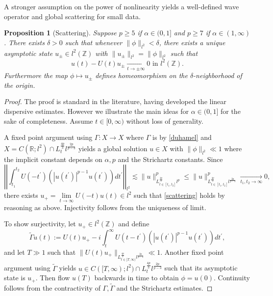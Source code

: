 \documentclass{article}
\numberwithin{equation}{section}
\newtheorem{proposition}{Proposition}[section]
\begin{document}
A stronger assumption on the power of nonlinearity yields a well-defined wave operator and global scattering for small data.
\begin{proposition}[Scattering]\label{scattering2}
Suppose $p \geq 5$ if $\alpha \in (0,1]$ and $p \geq 7$ if $\alpha \in (1,\infty)$. There exists $\delta > 0$ such that whenever $\| \phi \|_{l^2} < \delta$, there exists a unique asymptotic state $u_{\pm} \in l^2(\mathbb{Z})$ with 
$\| u_{\pm} \|_{l^2} = \| \phi \|_{l^2}$ such that
\begin{equation}\label{scattering}
 u(t) - U(t)u_{\pm} \xrightarrow[t\rightarrow \pm\infty]{} 0 \text{ in } l^2(\mathbb{Z}). 
\end{equation}
Furthermore the map $\phi \mapsto u_{\pm}$ defines homeomorphism on the $\delta$-neighborhood of the origin. 
\end{proposition}
\begin{proof}
The proof is standard in the literature, having developed the linear dispersive estimates. However we illustrate the main ideas for $\alpha \in (0,1]$ for the sake of completeness. Assume $t \in [0,\infty)$ without loss of generality.

A fixed point argument using $\Gamma: X \rightarrow X$ where $\Gamma$ is by \eqref{duhamel} and $X = C(\mathbb{R};l^2) \cap L_t^{\frac{4p}{3}}l^{\frac{2p}{p-3}}$ yields a global solution $u \in X$ with $\| \phi \|_{l^2} \ll 1$ where the implicit constant depends on $\alpha,p$ and the Strichartz constants. Since
\begin{equation*}
    \left|\left| \int_{t_1}^{t_2} U(-t^\prime) \left(|u(t^\prime)|^{p-1}u(t^\prime)\right)dt^\prime\right|\right|_{l^2} \lesssim \| u\|_{L_{t \in [t_1,t_2]}^{\frac{4p}{3}}l^p}^p \leq \| u\|_{L_{t \in [t_1,t_2]}^{\frac{4p}{3}}l^{\frac{2p}{p-3}}}^p \xrightarrow[t_1,t_2 \rightarrow \infty]{} 0,
\end{equation*}
there exists $u_+ = \lim\limits_{t \rightarrow \infty} U(-t)u(t)\in l^2$ such that \eqref{scattering} holds by reasoning as above. Injectivity follows from the uniqueness of limit.

To show surjectivity, let $u_+ \in l^2(\mathbb{Z})$ and define
\begin{equation*}
\tilde{\Gamma} u(t) := U(t) u_{+} - i \int_t^{\infty} U(t-t^\prime)\left(|u(t^\prime)|^{p-1}u(t^\prime)\right)dt^\prime,
\end{equation*}
and let $T \gg 1$ such that $\| U(t) u_+\|_{L_{t \in [T,\infty)}^{\frac{4p}{3}}l^{\frac{2p}{p-3}}} \ll 1$. Another fixed point argument using $\tilde{\Gamma}$ yields $u \in C([T,\infty);l^2) \cap L_t^{\frac{4p}{3}}l^{\frac{2p}{p-3}}$ such that its asymptotic state is $u_+$. Then flow $u(T)$ backwards in time to obtain $\phi = u(0)$. Continuity follows from the contractivity of $\Gamma,\tilde{\Gamma}$ and the Strichartz estimates.
\end{proof}
\end{document}
